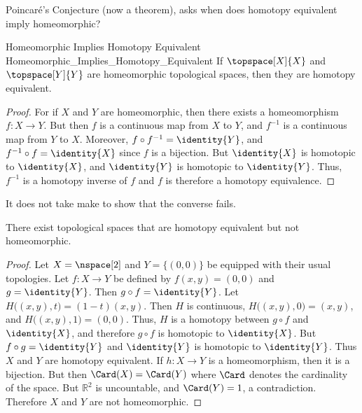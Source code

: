 \documentclass[oneside]{book}                                                  %
\begin{document}
                Poincar\'{e}'s Conjecture (now a theorem), asks when does
                homotopy equivalent imply homeomorphic?
                \begin{ltheorem}{Homeomorphic Implies Homotopy Equivalent}
                                {Homeomorphic_Implies_Homotopy_Equivalent}
                    If $\topspace[X]{X}$ and $\topspace[Y]{Y}$ are homeomorphic
                    topological spaces, then they are homotopy equivalent.
                \end{ltheorem}
                \begin{proof}
                    For if $X$ and $Y$ are homeomorphic, then there exists a
                    homeomorphism $f:X\rightarrow{Y}$. But then $f$ is a
                    continuous map from $X$ to $Y$, and $f^{-1}$ is a continuous
                    map from $Y$ to $X$. Moreover,
                    ${f}\circ{f^{-1}}=\identity{Y}$, and
                    ${f^{-1}}\circ{f}=\identity{X}$ since $f$ is a bijection.
                    But $\identity{X}$ is homotopic to $\identity{X}$, and
                    $\identity{Y}$ is homotopic to $\identity{Y}$. Thus,
                    $f^{\minus{1}}$ is a homotopy inverse of $f$ and $f$ is
                    therefore a homotopy equivalence.
                \end{proof}
                It does not take make to show that the converse fails.
                \begin{theorem}
                    \label{thm:homotopic_does_not_imply_homeomorphic}%
                    There exist topological spaces that are homotopy equivalent
                    but not homeomorphic.
                \end{theorem}
                \begin{proof}
                    Let $X=\nspace[2]$ and $Y=\{(0,0)\}$ be equipped with their
                    usual topologies. Let $f:X\rightarrow{Y}$ be defined by
                    $f(x,y)=(0,0)$ and $g=\identity{Y}$. Then
                    $g\circ{f}=\identity{Y}$. Let
                    $H\big((x,y),t\big)=(1-t)(x,y)$. Then $H$ is continuous,
                    $H\big((x,y),0\big)=(x,y)$, and $H\big((x,y),1\big)=(0,0)$.
                    Thus, $H$ is a homotopy between ${g}\circ{f}$ and
                    $\identity{X}$, and therefore ${g}\circ{f}$ is homotopic to
                    $\identity{X}$. But ${f}\circ{g}=\identity{Y}$ and
                    $\identity{Y}$ is homotopic to $\identity{Y}$. Thus $X$ and
                    $Y$ are homotopy equivalent. If $h:{X}\rightarrow{Y}$ is a
                    homeomorphism, then it is a bijection. But then
                    $\Card(X)=\Card(Y)$ where $\Card$ denotes the cardinality
                    of the space. But $\mathbb{R}^{2}$ is uncountable, and
                    $\Card(Y)=1$, a contradiction. Therefore $X$ and $Y$ are not
                    homeomorphic.
                \end{proof}
\end{document}
